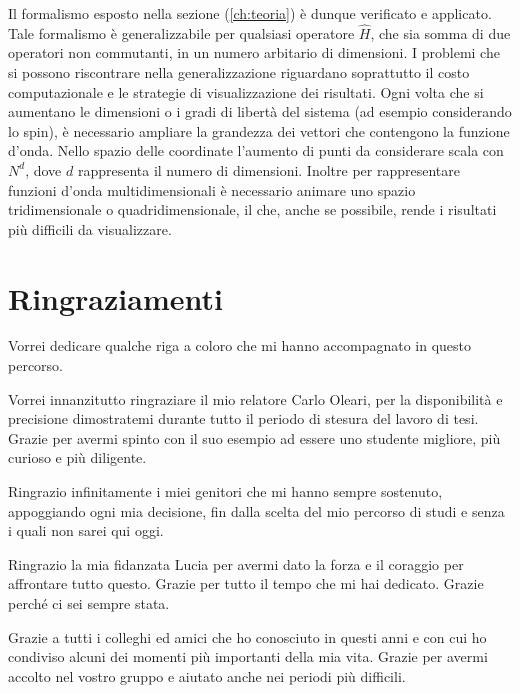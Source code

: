 \documentclass[12pt]{report}
\begin{document}
Il formalismo esposto nella sezione (\ref{ch:teoria}) è dunque verificato e applicato. Tale formalismo è generalizzabile per qualsiasi operatore $\hat{H}$, che sia somma di due operatori non commutanti, in un numero arbitario di dimensioni. I problemi che si possono riscontrare nella generalizzazione riguardano soprattutto il costo computazionale e le strategie di visualizzazione dei risultati. Ogni volta che si aumentano le dimensioni o i gradi di libertà del sistema (ad esempio considerando lo spin), è necessario ampliare la grandezza dei vettori che contengono la funzione d'onda. Nello spazio delle coordinate l'aumento di punti da considerare scala con $N^d$, dove $d$ rappresenta il numero di dimensioni. Inoltre per rappresentare funzioni d'onda multidimensionali è necessario animare uno spazio tridimensionale o quadridimensionale, il che, anche se possibile, rende i risultati più difficili da visualizzare. 

\chapter*{Ringraziamenti}
Vorrei dedicare qualche riga a coloro che mi hanno accompagnato in questo percorso.

Vorrei innanzitutto ringraziare il mio relatore Carlo Oleari, per la disponibilità e precisione dimostratemi durante tutto il periodo di stesura del lavoro di tesi. Grazie per avermi spinto con il suo esempio ad essere uno studente migliore, più curioso e più diligente. 

Ringrazio infinitamente i miei genitori che mi hanno sempre sostenuto, appoggiando ogni mia decisione, fin dalla scelta del mio percorso di studi e senza i quali non sarei qui oggi.

Ringrazio la mia fidanzata Lucia per avermi dato la forza e il coraggio per affrontare tutto questo. Grazie per tutto il tempo che mi hai dedicato. Grazie perché ci sei sempre stata. 

Grazie a tutti i colleghi ed amici che ho conosciuto in questi anni e con cui ho condiviso alcuni dei momenti più importanti della mia vita. Grazie per avermi accolto nel vostro gruppo e aiutato anche nei periodi più difficili. 

\printbibliography
\nocite{*}
\end{document}

